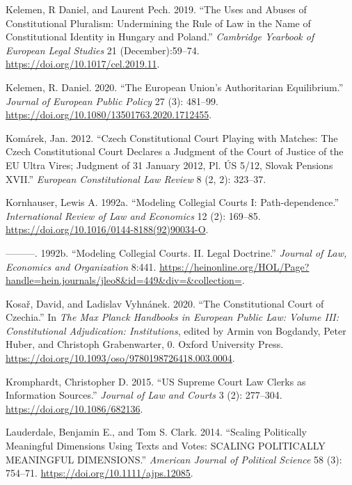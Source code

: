 \documentclass[
  11pt,
]{article}
\newlength{\cslhangindent}
\newenvironment{CSLReferences}[2] %
 {\begin{list}{}{%
  \setlength{\itemindent}{0pt}
  \setlength{\leftmargin}{0pt}
  \setlength{\parsep}{0pt}
  \ifodd #1
   \setlength{\leftmargin}{\cslhangindent}
   \setlength{\itemindent}{-1\cslhangindent}
  \fi
  \setlength{\itemsep}{#2\baselineskip}}}
 {\end{list}}
\begin{document}
\begin{CSLReferences}{1}{0}
Kelemen, R Daniel, and Laurent Pech. 2019. {``The {Uses} and {Abuses} of {Constitutional Pluralism}: {Undermining} the {Rule} of {Law} in the {Name} of {Constitutional Identity} in {Hungary} and {Poland}.''} \emph{Cambridge Yearbook of European Legal Studies} 21 (December):59--74. \url{https://doi.org/10.1017/cel.2019.11}.

Kelemen, R. Daniel. 2020. {``The {European Union}'s Authoritarian Equilibrium.''} \emph{Journal of European Public Policy} 27 (3): 481--99. \url{https://doi.org/10.1080/13501763.2020.1712455}.

Komárek, Jan. 2012. {``Czech {Constitutional Court Playing} with {Matches}: The {Czech Constitutional Court Declares} a {Judgment} of the {Court} of {Justice} of the {EU Ultra Vires}; {Judgment} of 31 {January} 2012, {Pl}. {ÚS} 5/12, {Slovak Pensions XVII}.''} \emph{European Constitutional Law Review} 8 (2, 2): 323--37.

Kornhauser, Lewis A. 1992a. {``Modeling Collegial Courts {I}: {Path-dependence}.''} \emph{International Review of Law and Economics} 12 (2): 169--85. \url{https://doi.org/10.1016/0144-8188(92)90034-O}.

---------. 1992b. {``Modeling {Collegial Courts}. {II}. {Legal Doctrine}.''} \emph{Journal of Law, Economics and Organization} 8:441. \url{https://heinonline.org/HOL/Page?handle=hein.journals/jleo8&id=449&div=&collection=}.

Kosař, David, and Ladislav Vyhnánek. 2020. {``The {Constitutional Court} of {Czechia}.''} In \emph{The {Max Planck Handbooks} in {European Public Law}: {Volume III}: {Constitutional Adjudication}: {Institutions}}, edited by Armin von Bogdandy, Peter Huber, and Christoph Grabenwarter, 0. Oxford University Press. \url{https://doi.org/10.1093/oso/9780198726418.003.0004}.

Kromphardt, Christopher D. 2015. {``{US Supreme Court Law Clerks} as {Information Sources}.''} \emph{Journal of Law and Courts} 3 (2): 277--304. \url{https://doi.org/10.1086/682136}.

Lauderdale, Benjamin E., and Tom S. Clark. 2014. {``Scaling {Politically Meaningful Dimensions Using Texts} and {Votes}: {SCALING POLITICALLY MEANINGFUL DIMENSIONS}.''} \emph{American Journal of Political Science} 58 (3): 754--71. \url{https://doi.org/10.1111/ajps.12085}.


\end{CSLReferences}
\end{document}
